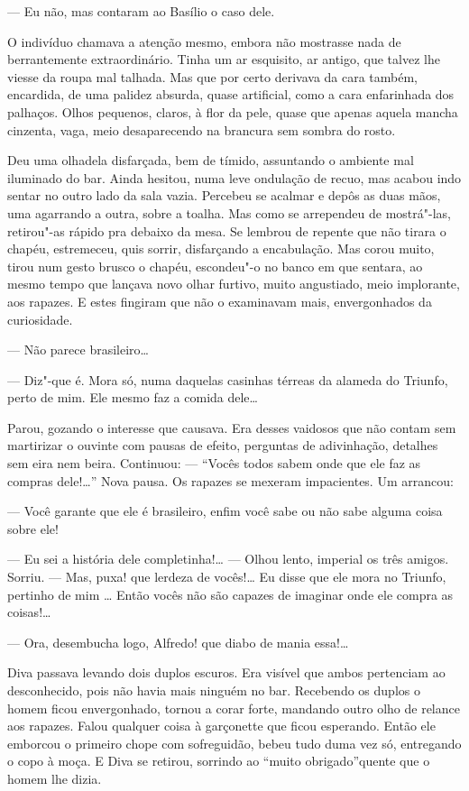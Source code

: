 --- Eu não, mas contaram ao Basílio o caso dele.

O indivíduo chamava a atenção mesmo, embora não mostrasse nada de
berrantemente extraordinário. Tinha um ar esquisito, ar antigo, que
talvez lhe viesse da roupa mal talhada. Mas que por certo derivava da
cara também, encardida, de uma palidez absurda, quase artificial, como a
cara enfarinhada dos palhaços. Olhos pequenos, claros, à flor da pele,
quase que apenas aquela mancha cinzenta, vaga, meio desaparecendo na
brancura sem sombra do rosto.

Deu uma olhadela disfarçada, bem de tímido, assuntando o ambiente mal
iluminado do bar. Ainda hesitou, numa leve ondulação de recuo, mas
acabou indo sentar no outro lado da sala vazia. Percebeu se acalmar e
depôs as duas mãos, uma agarrando a outra, sobre a toalha. Mas como se
arrependeu de mostrá"-las, retirou"-as rápido pra debaixo da mesa. Se
lembrou de repente que não tirara o chapéu, estremeceu, quis sorrir,
disfarçando a encabulação. Mas corou muito, tirou num gesto brusco o
chapéu, escondeu"-o no banco em que sentara, ao mesmo tempo que lançava
novo olhar furtivo, muito angustiado, meio implorante, aos rapazes. E
estes fingiram que não o examinavam mais, envergonhados da curiosidade.

--- Não parece brasileiro\ldots{}

--- Diz"-que é. Mora só, numa daquelas casinhas térreas da alameda do
Triunfo, perto de mim. Ele mesmo faz a comida dele\ldots{}

Parou, gozando o interesse que causava. Era desses vaidosos que não
contam sem martirizar o ouvinte com pausas de efeito, perguntas de
adivinhação, detalhes sem eira nem beira. Continuou: --- ``Vocês todos
sabem onde que ele faz as compras dele!\ldots{}'' Nova pausa. Os rapazes se
mexeram impacientes. Um arrancou:

--- Você garante que ele é brasileiro, enfim você sabe ou não sabe
alguma coisa sobre ele!

--- Eu sei a história dele completinha!\ldots{} --- Olhou lento, imperial os
três amigos. Sorriu. --- Mas, puxa! que lerdeza de vocês!\ldots{} Eu disse
que ele mora no Triunfo, pertinho de mim \ldots{} Então vocês não são capazes
de imaginar onde ele compra as coisas!\ldots{}

--- Ora, desembucha logo, Alfredo! que diabo de mania essa!\ldots{}

Diva passava levando dois duplos escuros. Era visível que ambos
pertenciam ao desconhecido, pois não havia mais ninguém no bar.
Recebendo os duplos o homem ficou envergonhado, tornou a corar forte,
mandando outro olho de relance aos rapazes. Falou qualquer coisa à
garçonette que ficou esperando. Então ele emborcou o primeiro chope com
sofreguidão, bebeu tudo duma vez só, entregando o copo à moça. E Diva se
retirou, sorrindo ao ``muito obrigado''quente que o homem lhe dizia.

